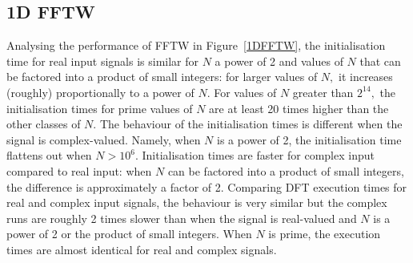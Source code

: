 \documentclass[12pt, a4paper]{article} \setlength{\textheight}{24cm}
\begin{document}
\subsection{1D FFTW}\label{Sec:FFTW1d}
Analysing the performance of FFTW in Figure~\ref{1DFFTW}, the
initialisation time for real input signals is similar for $N$ a power
of 2 and values of $N$ that can be factored into a product of small
integers: for larger values of $N,$ it increases (roughly) proportionally to a
power of $N.$ For values of $N$ greater than $2^{14},$ the
initialisation times for prime values of $N$ are at least 20 times
higher than the other classes of $N.$ The behaviour of the
initialisation times is different when the signal is complex-valued.
Namely, when $N$ is a power of 2, the initialisation time flattens out
when $N>10^6.$ Initialisation times are faster for complex input
compared to real input: when $N$ can be factored into a product of
small integers, the difference is approximately a factor of 2.
Comparing DFT execution times for real and complex input signals, the
behaviour is very similar but the complex runs are roughly 2 times
slower than when the signal is real-valued and $N$ is a power of 2 or
the product of small integers. When $N$ is prime, the execution times
are almost identical for real and complex signals.
\end{document}
